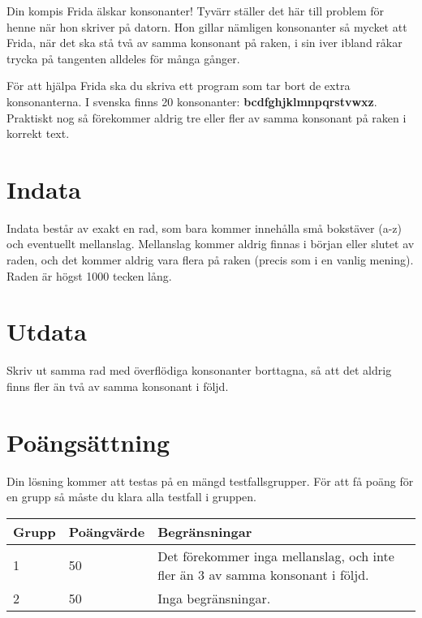 Din kompis Frida älskar konsonanter! Tyvärr ställer det här till problem för henne när hon skriver på datorn. Hon gillar nämligen konsonanter så mycket att Frida, när det ska stå två av samma konsonant på raken, i sin iver ibland råkar trycka på tangenten alldeles för många gånger.

För att hjälpa Frida ska du skriva ett program som tar bort de extra konsonanterna. I svenska finns 20 konsonanter: \textbf{bcdfghjklmnpqrstvwxz}. Praktiskt nog så förekommer aldrig tre eller fler av samma konsonant på raken i korrekt text.

\section*{Indata}
Indata består av exakt en rad, som bara kommer innehålla små bokstäver (a-z) och eventuellt mellanslag. Mellanslag kommer aldrig finnas i början eller slutet av raden, och det kommer aldrig vara flera på raken (precis som i en vanlig mening). Raden är högst 1000 tecken lång.

\section*{Utdata}
Skriv ut samma rad med överflödiga konsonanter borttagna, så att det aldrig finns fler än två av samma konsonant i följd.

\section*{Poängsättning}
Din lösning kommer att testas på en mängd testfallsgrupper.
För att få poäng för en grupp så måste du klara alla testfall i gruppen.

\noindent
\begin{tabular}{| l | l | l |}
\hline
Grupp & Poängvärde & Begränsningar \\ \hline
1     & 50          &  Det förekommer inga mellanslag, och inte fler än 3 av samma konsonant i följd.\\ \hline
2     & 50         &  Inga begränsningar. \\ \hline
\end{tabular}

